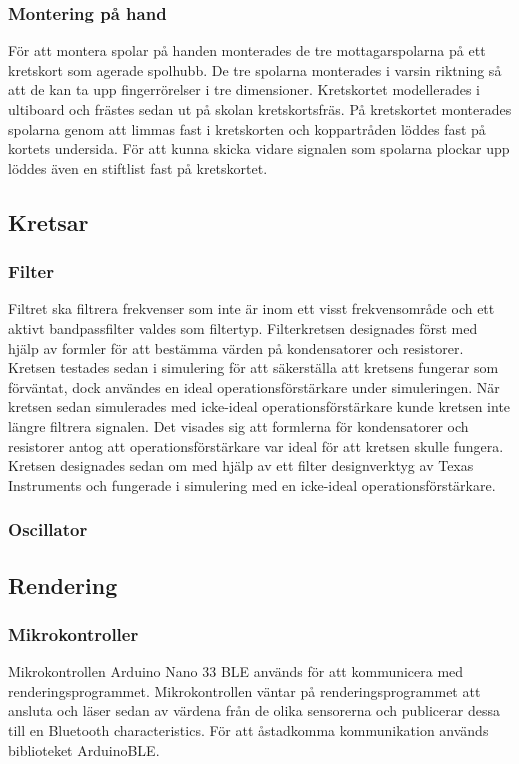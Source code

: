 \documentclass[a4paper]{article}
\begin{document}
\begin{sloppypar}
    \subsubsection{Montering på hand} %
    För att montera spolar på handen monterades de tre mottagarspolarna på ett kretskort som agerade spolhubb.
    De tre spolarna monterades i varsin riktning så att de kan ta upp fingerrörelser i tre dimensioner.
    Kretskortet modellerades i ultiboard och frästes sedan ut på skolan kretskortsfräs.
    På kretskortet monterades spolarna genom att limmas fast i kretskorten och koppartråden löddes fast på kortets undersida.
    För att kunna skicka vidare signalen som spolarna plockar upp löddes även en stiftlist fast på kretskortet.


    \subsection{Kretsar}
    \subsubsection{Filter}
    Filtret ska filtrera frekvenser som inte är inom ett visst frekvensområde och ett aktivt bandpassfilter valdes som filtertyp.
    Filterkretsen designades först med hjälp av formler för att bestämma värden på kondensatorer och resistorer.
    Kretsen testades sedan i simulering för att säkerställa att kretsens fungerar som förväntat,
    dock användes en ideal operationsförstärkare under simuleringen.
    När kretsen sedan simulerades med icke-ideal operationsförstärkare kunde kretsen inte längre filtrera signalen.
    Det visades sig att formlerna för kondensatorer och resistorer
    antog att operationsförstärkare var ideal för att kretsen skulle fungera.
    Kretsen designades sedan om med hjälp av ett filter designverktyg av Texas Instruments
    och fungerade i simulering med en icke-ideal operationsförstärkare.
    \subsubsection{Oscillator}


    \subsection{Rendering}
    \subsubsection{Mikrokontroller}
    Mikrokontrollen Arduino Nano 33 BLE används för att kommunicera med renderingsprogrammet.
    Mikrokontrollen väntar på renderingsprogrammet att ansluta och
    läser sedan av värdena från de olika sensorerna och publicerar dessa till en Bluetooth characteristics.
    För att åstadkomma kommunikation används biblioteket ArduinoBLE.


\end{sloppypar}
\end{document}

